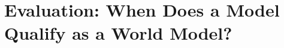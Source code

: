 \documentclass[pdflatex,sn-mathphys-num]{sn-jnl}
\theoremstyle{thmstyleone}%
\theoremstyle{thmstyletwo}%
\theoremstyle{thmstylethree}%
\begin{document}


\section{Evaluation: When Does a Model Qualify as a World Model?}
\end{document}
